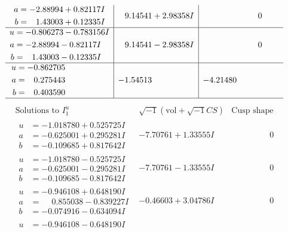 \documentclass[1p]{elsarticle_modified}
\theoremstyle{definition}
\newcommand{\I}{\sqrt{-1}}
\begin{document}
$$\begin{array}{c|c|c}
\begin{aligned}
a &= -2.88994 + 0.82117 I \\
b &= \phantom{-}1.43003 + 0.12335 I\end{aligned}
 & \phantom{-}9.14541 + 2.98358 I & \phantom{-0.000000 } 0 \\ \hline\begin{aligned}
u &= -0.806273 - 0.783156 I \\
a &= -2.88994 - 0.82117 I \\
b &= \phantom{-}1.43003 - 0.12335 I\end{aligned}
 & \phantom{-}9.14541 - 2.98358 I & \phantom{-0.000000 } 0 \\ \hline\begin{aligned}
u &= -0.862705\phantom{ +0.000000I} \\
a &= \phantom{-}0.275443\phantom{ +0.000000I} \\
b &= \phantom{-}0.403590\phantom{ +0.000000I}\end{aligned}
 & -1.54513\phantom{ +0.000000I} & -4.21480\phantom{ +0.000000I}\\
 \hline 
 \end{array}$$\newpage$$\begin{array}{c|c|c}  
\text{Solutions to }I^u_{1}& \I (\text{vol} + \sqrt{-1}CS) & \text{Cusp shape}\\
 \hline 
\begin{aligned}
u &= -1.018780 + 0.525725 I \\
a &= -0.625001 + 0.295281 I \\
b &= -0.109685 + 0.817642 I\end{aligned}
 & -7.70761 + 1.33555 I & \phantom{-0.000000 } 0 \\ \hline\begin{aligned}
u &= -1.018780 - 0.525725 I \\
a &= -0.625001 - 0.295281 I \\
b &= -0.109685 - 0.817642 I\end{aligned}
 & -7.70761 - 1.33555 I & \phantom{-0.000000 } 0 \\ \hline\begin{aligned}
u &= -0.946108 + 0.648190 I \\
a &= \phantom{-}0.855038 - 0.839227 I \\
b &= -0.074916 - 0.634094 I\end{aligned}
 & -0.46603 + 3.04786 I & \phantom{-0.000000 } 0 \\ \hline\begin{aligned}
u &= -0.946108 - 0.648190 I \\

\end{aligned}
\end{array}$$
\end{document}
